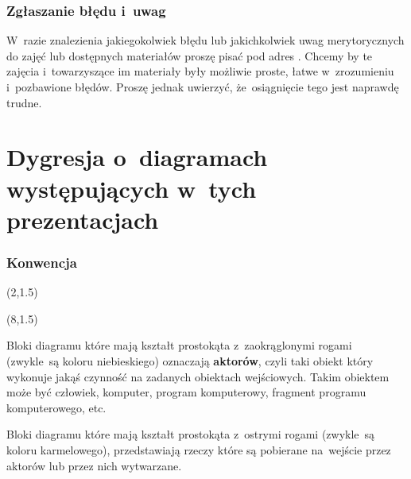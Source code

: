 \documentclass[10pt,t]{beamer}
\begin{document}
\begin{frame}
  \frametitle{Zgłaszanie błędu i~uwag}


  W~razie znalezienia jakiegokolwiek błędu lub jakichkolwiek uwag
  merytorycznych do zajęć lub dostępnych materiałów proszę pisać pod adres
  \email. Chcemy by te zajęcia i~towarzyszące im materiały były możliwie
  proste, łatwe w~zrozumieniu i~pozbawione błędów. Proszę jednak uwierzyć,
  że~osiągnięcie tego jest naprawdę trudne.

\end{frame}










\section{Dygresja o~diagramach występujących w~tych
  prezentacjach}



\begin{frame}
  \frametitle{Konwencja}


  \begin{textblock}{2.8}(2,1.5)


  \end{textblock}



  \begin{textblock}{2.8}(8,1.5)


  \end{textblock}


  \vspace{6em}





  Bloki diagramu które mają kształt prostokąta z~zaokrąglonymi rogami
  (zwykle~są koloru niebieskiego) oznaczają \textbf{aktorów}, czyli
  taki obiekt który wykonuje jakąś czynność na zadanych obiektach
  wejściowych. Takim obiektem może być człowiek, komputer, program
  komputerowy, fragment programu komputerowego, etc.

  Bloki diagramu które mają kształt prostokąta z~ostrymi rogami (zwykle~są
  koloru karmelowego), przedstawiają rzeczy które są pobierane na~wejście
  przez aktorów lub przez nich wytwarzane.

\end{frame}
\end{document}
